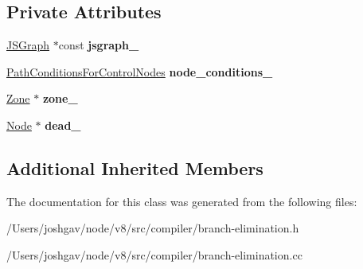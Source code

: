 \subsection*{Private Attributes}
\begin{DoxyCompactItemize}
\item 
\hyperlink{classv8_1_1internal_1_1compiler_1_1_j_s_graph}{J\+S\+Graph} $\ast$const {\bfseries jsgraph\+\_\+}\hypertarget{classv8_1_1internal_1_1compiler_1_1_branch_elimination_a3e2f4fcf98d7cf25d01074b64020735b}{}\label{classv8_1_1internal_1_1compiler_1_1_branch_elimination_a3e2f4fcf98d7cf25d01074b64020735b}

\item 
\hyperlink{classv8_1_1internal_1_1compiler_1_1_branch_elimination_1_1_path_conditions_for_control_nodes}{Path\+Conditions\+For\+Control\+Nodes} {\bfseries node\+\_\+conditions\+\_\+}\hypertarget{classv8_1_1internal_1_1compiler_1_1_branch_elimination_a40740aacd47fe1c6cbfbb955344e7cab}{}\label{classv8_1_1internal_1_1compiler_1_1_branch_elimination_a40740aacd47fe1c6cbfbb955344e7cab}

\item 
\hyperlink{classv8_1_1internal_1_1_zone}{Zone} $\ast$ {\bfseries zone\+\_\+}\hypertarget{classv8_1_1internal_1_1compiler_1_1_branch_elimination_a55661a3e604bd861560f679e093da704}{}\label{classv8_1_1internal_1_1compiler_1_1_branch_elimination_a55661a3e604bd861560f679e093da704}

\item 
\hyperlink{classv8_1_1internal_1_1compiler_1_1_node}{Node} $\ast$ {\bfseries dead\+\_\+}\hypertarget{classv8_1_1internal_1_1compiler_1_1_branch_elimination_aca894a29350a7861582a8b28c25529f0}{}\label{classv8_1_1internal_1_1compiler_1_1_branch_elimination_aca894a29350a7861582a8b28c25529f0}

\end{DoxyCompactItemize}
\subsection*{Additional Inherited Members}


The documentation for this class was generated from the following files\+:\begin{DoxyCompactItemize}
\item 
/\+Users/joshgav/node/v8/src/compiler/branch-\/elimination.\+h\item 
/\+Users/joshgav/node/v8/src/compiler/branch-\/elimination.\+cc\end{DoxyCompactItemize}
